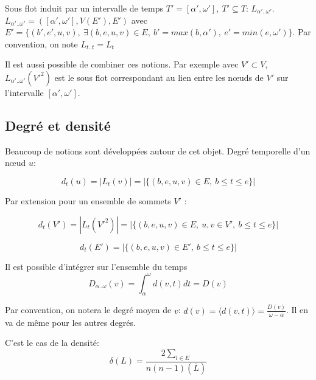 Sous flot induit par un intervalle de temps $T'=[\alpha', \omega'],\ T' \subseteq T$: $L_{\alpha'..\omega'}$.
$L_{\alpha'..\omega'}=([\alpha', \omega'],V(E'),E')$ avec $E'= \{(b',e',u,v),\ \exists (b,e,u,v) \in E,\ b'= max(b,\alpha'),\ e'=min(e,\omega')\}$.
Par convention, on note $L_{t..t}=L_{t}$


Il est aussi possible de combiner ces notions.
Par exemple avec $V' \subset V$, $L_{\alpha'..\omega'}(V'^2)$ est le sous flot correspondant au lien entre les n\oe uds de $V'$ sur l'intervalle $[\alpha', \omega']$.


\subsection{Degré et densité}
Beaucoup de notions sont développées autour de cet objet.
Degré temporelle d'un n\oe ud $u$:

\begin{equation}
d_t(u)= |L_t(v)| = |\{(b,e,u,v) \in E,\ b \leq t \leq e\}|
\end{equation}

Par extension pour un ensemble de sommets $V'$ :

\begin{equation}
d_t(V')= |L_{t}(V'^2)| = |\{(b,e,u,v) \in E,\ u,v \in V',\ b \leq t \leq e\}|
\end{equation}


\begin{equation}
d_t(E')= |\{(b,e,u,v) \in E',\ b \leq t \leq e\}|
\end{equation}

Il est possible d'intégrer sur l'ensemble du temps 
\begin{equation}
D_{\alpha..\omega}(v)= \int_{\alpha}^{\omega}d(v,t) dt=D(v)
\end{equation}

Par convention, on notera le degré moyen de $v$: $d(v)= \langle d(v,t) \rangle=\frac{D(v)}{\omega-\alpha}$.
Il en va de même pour les autres degrés.

C'est le cas de la densité:
\begin{equation}
\delta(L)= \frac{2\sum_{l \in E}}{n(n-1)(\bar{L})}
\end{equation}


